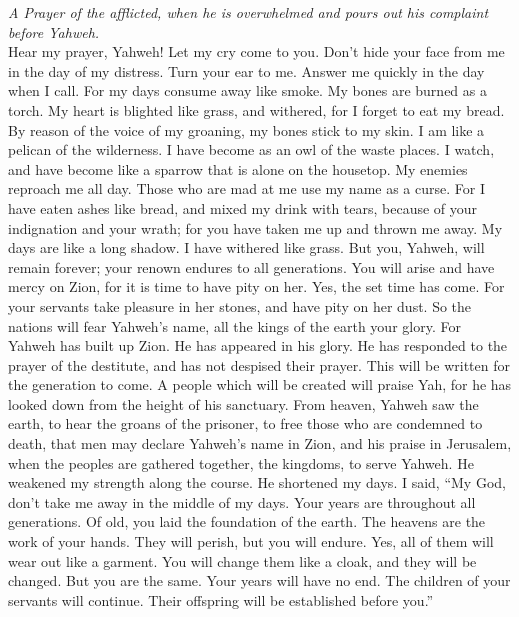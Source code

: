 \emph{A Prayer of the afflicted, when he is overwhelmed and pours out
his complaint before Yahweh.}\\
 Hear my prayer, Yahweh! Let my cry come to you.
 Don't hide your face from me in the day of my distress.
Turn your ear to me. Answer me quickly in the day when I call.
 For my days consume away like smoke. My bones are burned
as a torch.  My heart is blighted like grass, and
withered, for I forget to eat my bread.  By reason of the
voice of my groaning, my bones stick to my skin.  I am
like a pelican of the wilderness. I have become as an owl of the waste
places.  I watch, and have become like a sparrow that is
alone on the housetop.  My enemies reproach me all day.
Those who are mad at me use my name as a curse.  For I
have eaten ashes like bread, and mixed my drink with tears,
 because of your indignation and your wrath; for you have
taken me up and thrown me away.  My days are like a long
shadow. I have withered like grass.  But you, Yahweh,
will remain forever; your renown endures to all generations.
 You will arise and have mercy on Zion, for it is time to
have pity on her. Yes, the set time has come.  For your
servants take pleasure in her stones, and have pity on her dust.
 So the nations will fear Yahweh's name, all the kings of
the earth your glory.  For Yahweh has built up Zion. He
has appeared in his glory.  He has responded to the
prayer of the destitute, and has not despised their prayer.
 This will be written for the generation to come. A
people which will be created will praise Yah,  for he has
looked down from the height of his sanctuary. From heaven, Yahweh saw
the earth,  to hear the groans of the prisoner, to free
those who are condemned to death,  that men may declare
Yahweh's name in Zion, and his praise in Jerusalem,  when
the peoples are gathered together, the kingdoms, to serve Yahweh.
 He weakened my strength along the course. He shortened
my days.  I said, ``My God, don't take me away in the
middle of my days. Your years are throughout all generations.
 Of old, you laid the foundation of the earth. The
heavens are the work of your hands.  They will perish,
but you will endure. Yes, all of them will wear out like a garment. You
will change them like a cloak, and they will be changed. 
But you are the same. Your years will have no end.  The
children of your servants will continue. Their offspring will be
established before you.''


